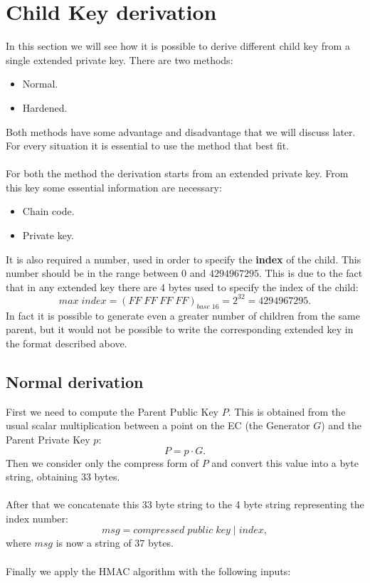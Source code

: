 \section{Child Key derivation}
In this section we will see how it is possible to derive different child key from a single extended private key. There are two methods:
\begin{itemize}
	\item Normal.
	\item Hardened.
\end{itemize}
Both methods have some advantage and disadvantage that we will discuss later. For every situation it is essential to use the method that best fit.
\\ \\
For both the method the derivation starts from an extended private key. From this key some essential information are necessary:
\begin{itemize}[label=$\star$]
	\item Chain code.
	\item Private key.
\end{itemize}
It is also required a number, used in order to specify the \textbf{index} of the child. This number should be in the range between $0$ and $4294967295$. This is due to the fact that in any extended key there are 4 bytes used to specify the index of the child:
\begin{equation*}
max \; index=(FF\;FF\;FF\;FF)_{base \; 16} = 2^{32} = 4294967295.
\end{equation*}
In fact it is possible to generate even a greater number of children from the same parent, but it would not be possible to write the corresponding extended key in the format described above.


\subsection{Normal derivation}

First we need to compute the Parent Public Key $P$. This is obtained from the usual scalar multiplication between a point on the EC (the Generator $G$) and the Parent Private Key $p$:
\begin{equation*}
P=p\cdot G.
\end{equation*}
Then we consider only the compress form of $P$ and convert this value into a byte string, obtaining 33 bytes.
\\ \\
After that we concatenate this 33 byte string to the 4 byte string representing the index number:
\begin{equation*}
msg = compressed \; public\;key \;|\; index,
\end{equation*}
where $msg$ is now a string of $37$ bytes. \\ \\
Finally we apply the HMAC algorithm with the following inputs:

